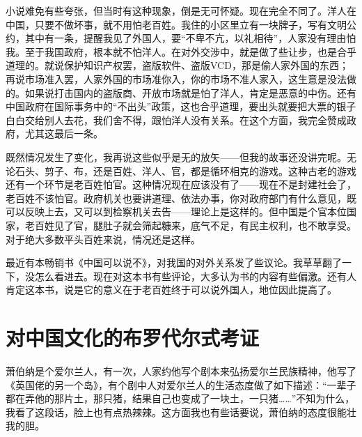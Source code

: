 小说难免有些夸张，但当时有这种现象，倒是无可怀疑。现在完全不同了。洋人在中国，只要不做坏事，就不用怕老百姓。我住的小区里立有一块牌子，写有文明公约，其中有一条，提醒我见了外国人，要“不卑不亢，以礼相待”，人家没有理由怕我。至于我国政府，根本就不怕洋人。在对外交涉中，就是做了些让步，也是合乎道理的。就说保护知识产权罢，盗版软件、盗版VCD，那是偷人家外国的东西；再说市场准入罢，人家外国的市场准你入，你的市场不准人家入，这生意是没法做的。如果说打击国内的盗版商、开放市场就是怕了洋人，肯定是恶意的中伤。还有中国政府在国际事务中的“不出头”政策，这也合乎道理，要出头就要把大票的银子白白交给别人去花，我们舍不得，跟怕洋人没有关系。在这个方面，我完全赞成政府，尤其这最后一条。 

既然情况发生了变化，我再说这些似乎是无的放矢——但我的故事还没讲完呢。无论石头、剪子、布，还是百姓、洋人、官，都是循环相克的游戏。这种古老的游戏还有一个环节是老百姓怕官。这种情况现在应该没有了——现在不是封建社会了，老百姓不该怕官。政府机关也要讲道理、依法办事，你对政府部门有什么意见，既可以反映上去，又可以到检察机关去告——理论上是这样的。但中国是个官本位国家，老百姓见了官，腿肚子就会筛起糠来，底气不足，有民主权利，也不敢享受。对于绝大多数平头百姓来说，情况还是这样。 

最近有本畅销书《中国可以说不》，对我国的对外关系发了些议论。我草草翻了一下，没怎么看进去。现在对这本书有些评论，大多认为书的内容有些偏激。还有人肯定这本书，说是它的意义在于老百姓终于可以说外国人，地位因此提高了。

\chapter{对中国文化的布罗代尔式考证}

萧伯纳是个爱尔兰人，有一次，人家约他写个剧本来弘扬爱尔兰民族精神，他写了《英国佬的另一个岛》，有个剧中人对爱尔兰人的生活态度做了如下描述：“一辈子都在弄他的那片土，那只猪，结果自己也变成了一块土，一只猪……”不知为什么，我看了这段话，脸上也有点热辣辣。这方面我也有些话要说，萧伯纳的态度很能壮我的胆。 

